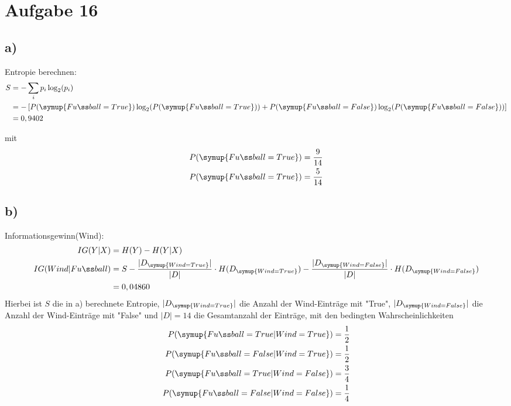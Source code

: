 \section{Aufgabe 16}
\subsection{a)}
Entropie berechnen:
\begin{align*}
  S &= - \sum_i p_i\log_2(p_i) \\
    &= - \left[ P(\symup{Fußball=True})\log_2(P(\symup{Fußball=True})) +
        P(\symup{Fußball=False})\log_2(P(\symup{Fußball=False}))\right] \\
    &= 0,9402 \\
\end{align*}

mit
\begin{align*}
  P(\symup{Fußball=True}) &= \frac{9}{14}\\
  P(\symup{Fußball=True}) &= \frac{5}{14}\\
\end{align*}

\subsection{b)}
Informationsgewinn(Wind):
\begin{align*}
  IG(Y|X) &= H(Y)-H(Y|X) \\
  IG(Wind|Fußball) &= S - \frac{|D_{\symup{Wind=True}}|}{|D|} \cdot
                          H(D_{\symup{Wind=True}}) -
                          \frac{|D_{\symup{Wind=False}}|}{|D|} \cdot
                          H(D_{\symup{Wind=False}})\\
                  &= 0,04860\\
\end{align*}
Hierbei ist $S$ die in a) berechnete Entropie, $|D_{\symup{Wind=True}}|$ die
Anzahl der Wind-Einträge mit "True", $|D_{\symup{Wind=False}}|$ die Anzahl der
Wind-Einträge mit "False" und $|D|=14$ die Gesamtanzahl der Einträge,
mit den bedingten Wahrscheinlichkeiten
\begin{align*}
  P(\symup{Fußball=True|Wind=True}) = \frac{1}{2} \\
  P(\symup{Fußball=False|Wind=True}) = \frac{1}{2} \\
  P(\symup{Fußball=True|Wind=False}) = \frac{3}{4} \\
  P(\symup{Fußball=False|Wind=False}) = \frac{1}{4} \\
\end{align*}

